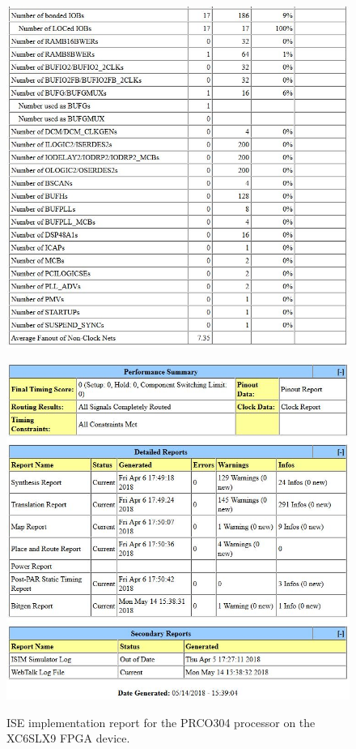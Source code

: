 \documentclass[11pt,a4paper]{report}
\newcommand{\scname}{PRCO304}
\begin{document}
\begin{figure}[H]
\begin{minipage}{0.5\textwidth}
\includegraphics[scale=0.43]{ise2}
    \end{minipage}
    \begin{minipage}{0.01\textwidth}\hfill\end{minipage}
    \begin{minipage}{0.5\textwidth}
        \centering
\includegraphics[scale=0.45]{ise3}\\
    \end{minipage}
    \caption{ISE implementation report for the \scname{} processor on the XC6SLX9 FPGA device.}
    \label{fig:}
\end{figure}


\end{document}
